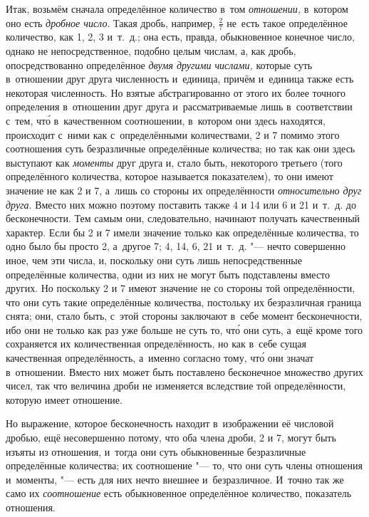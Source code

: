 Итак, возьмём сначала определённое количество в~том {\em отношении,} в~котором
оно есть {\em дробное число}. Такая дробь, например, $\frac 2 7$ не~есть такое
определённое количество, как 1, 2, 3 и~т.~д.; она есть, правда, обыкновенное
конечное число, однако не непосредственное, подобно целым числам, а, как дробь,
опосредствованно определённое {\em двумя другими числами,} которые суть
в~отношении друг друга численность и~единица, причём и~единица также есть
некоторая численность. Но взятые абстрагированно от этого их более точного
определения в~отношении друг друга и~рассматриваемые лишь в~соответствии с~тем,
чт\'{о} в~качественном соотношении, в~котором они здесь находятся, происходит
с~ними как с~определёнными количествами, 2 и 7 помимо этого соотношения суть
безразличные определённые количества; но так как они здесь выступают как
{\em моменты} друг друга и, стало быть, некоторого третьего (того определённого
количества, которое называется показателем), то они имеют значение не как 2 и
7, а~лишь со стороны их определённости {\em относительно друг друга}. Вместо них
можно поэтому поставить также 4 и 14 или 6 и 21 и~т.~д. до бесконечности. Тем
самым они, следовательно, начинают получать качественный характер. Если бы 2 и 7
имели значение только как определённые количества, то одно было бы просто
2, а~другое 7; 4, 14, 6, 21 и~т.~д. "--- нечто
совершенно иное, чем эти числа, и, поскольку они суть лишь
непосредственные определённые количества, одни из них не могут быть подставлены
вместо других. Но поскольку 2 и 7 имеют значение не со стороны той
определённости, что они суть такие определённые количества, постольку их
безразличная граница снята; они, стало быть, с~этой стороны заключают в~себе
момент бесконечности, ибо они не только как раз уже больше не суть то, чт\'{о}
они суть, а~ещё кроме того сохраняется их количественная определённость, но как
в~себе сущая качественная определённость, а~именно согласно тому, чт\'{о} они
значат в~отношении. Вместо них может быть поставлено бесконечное множество
других чисел, так что величина дроби не изменяется вследствие той
определённости, которую имеет отношение.

Но выражение, которое бесконечность находит в~изображении её числовой дробью,
ещё несовершенно потому, что оба члена дроби, 2 и 7, могут быть изъяты из
отношения, и~тогда они суть обыкновенные безразличные определённые количества;
их соотношение "--- то, что они суть члены отношения и~моменты, "--- есть
для них нечто внешнее и~безразличное. И~точно так же само их {\em соотношение}
есть обыкновенное определённое количество, показатель отношения.

